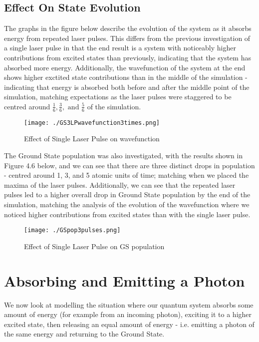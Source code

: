\subsection{Effect On State Evolution}
The graphs in the figure below describe the evolution of the system as it absorbs energy from repeated laser pulses. This differs from the previous investigation of a single laser pulse in that the end result is a system with noticeably higher contributions from excited states than previously, indicating that the system has absorbed more energy. Additionally, the wavefunction of the system at the end shows higher exctited state contributions than in the middle of the simulation - indicating that energy is absorbed both before and after the middle point of the simulation, matching expectations as the laser pulses were staggered to be centred around $\frac{1}{6}, \frac{3}{6}, \text{ and }\frac{5}{6}$ of the simulation.
\begin{figure}[H]
          \texttt{[image: ./GS3LPwavefunction3times.png]}
          \centering
          \caption{Effect of Single Laser Pulse on wavefunction}
\end{figure}

The Ground State population was also investigated, with the results shown in Figure 4.6 below, and we can see that there are three distinct drops in population - centred around 1, 3, and 5 atomic units of time; matching when we placed the maxima of the laser pulses. Additionally, we can see that the repeated laser pulses led to a higher overall drop in Ground State population by the end of the simulation, matching the analysis of the evolution of the wavefunction where we noticed higher contributions from excited states than with the single laser pulse.
\begin{figure}[H]
          \texttt{[image: ./GSpop3pulses.png]}
          \centering
          \caption{Effect of Single Laser Pulse on GS population}
\end{figure}

\section{Absorbing and Emitting a Photon}
We now look at modelling the situation where our quantum system absorbs some amount of energy (for example from an incoming photon), exciting it to a higher excited state, then releasing an equal amount of energy - i.e. emitting a photon of the same energy and returning to the Ground State.

